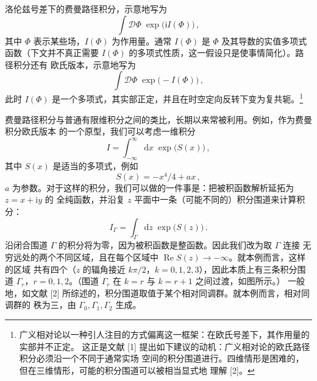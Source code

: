 \documentclass[11pt,a4paper,UTF8]{ctexart}
\theoremstyle{plain}
\theoremstyle{definition}
\newcommand{\dd}{\mathrm{d}}
\newcommand{\ee}{\mathrm{e}}
\newcommand{\ii}{\mathrm{i}}
\renewcommand{\Re}{\operatorname{Re}}
\begin{document}
洛伦兹号差下的费曼路径积分，示意地写为
\begin{equation}
  \int \mathcal{D}\Phi\; \exp\bigl(\ii I(\Phi)\bigr)\,,
  \tag{1.1}
\end{equation}
其中 $\Phi$ 表示某些场，$I(\Phi)$ 为作用量。通常 $I(\Phi)$ 是 $\Phi$ 及其导数的实值多项式
函数（下文并不真正需要 $I(\Phi)$ 的多项式性质，这一假设只是使事情简化）。路径积分还有
欧氏版本，示意地写为
\begin{equation}
  \int \mathcal{D}\Phi\; \exp\bigl(-I(\Phi)\bigr)\,,
  \tag{1.2}
\end{equation}
此时 $I(\Phi)$ 是一个多项式，其实部正定，并且在时空定向反转下变为复共轭。\footnote{%
  广义相对论以一种引人注目的方式偏离这一框架：在欧氏号差下，其作用量的实部并不正定。
  这正是文献 [1] 提出如下建议的动机：广义相对论的欧氏路径积分必须沿一个不同于通常实场
  空间的积分围道进行。四维情形是困难的，但在三维情形，可能的积分围道可以被相当显式地
  理解 [2]。}


费曼路径积分与普通有限维积分之间的类比，长期以来常被利用。例如，作为费曼积分欧氏版本
的一个原型，我们可以考虑一维积分
\begin{equation}
  I = \int_{-\infty}^{\infty} \dd x\; \exp\bigl(S(x)\bigr)\,,
  \tag{1.3}
\end{equation}
其中 $S(x)$ 是适当的多项式，例如
\begin{equation}
  S(x) = -x^{4}/4 + ax\,,
  \tag{1.4}
\end{equation}
$a$ 为参数。对于这样的积分，我们可以做的一件事是：把被积函数解析延拓为 $z=x+\ii y$ 的
全纯函数，并沿复 $z$ 平面中一条（可能不同的）积分围道来计算积分：
\begin{equation}
  I_{\Gamma} = \int_{\Gamma} \dd z\; \exp\bigl(S(z)\bigr)\,.
  \tag{1.5}
\end{equation}
沿闭合围道 $\Gamma$ 的积分将为零，因为被积函数是整函数。因此我们改为取 $\Gamma$ 连接
无穷远处的两个不同区域，且在每个区域中 $\Re S(z)\to -\infty$。就本例而言，这样的区域
共有四个（$z$ 的辐角接近 $k\pi/2$，$k=0,1,2,3$），因此本质上有三条积分围道
$\Gamma_{r}$，$r=0,1,2$。（围道 $\Gamma_{r}$ 在 $k=r$ 与 $k=r+1$ 之间过渡，如图所示。）
一般地，如文献 [2] 所综述的，积分围道取值于某个相对同调群。就本例而言，相对同调群的
秩为三，由 $\Gamma_{0},\Gamma_{1},\Gamma_{2}$ 生成。
\end{document}
